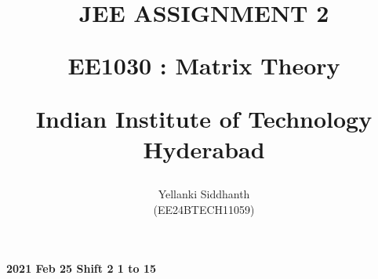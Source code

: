 \documentclass[journal]{IEEEtran}
\begin{document}

\onecolumn
\title{
JEE ASSIGNMENT 2

\large{EE1030 : Matrix Theory}

Indian Institute of Technology Hyderabad
}
\author{Yellanki Siddhanth

(EE24BTECH11059)
}	




\maketitle





\bigskip

\renewcommand{\thefigure}{\theenumi}
\renewcommand{\thetable}{\theenumi}
 
    
        \textbf{2021 Feb 25 Shift 2 1 to 15}
    
\end{document}
